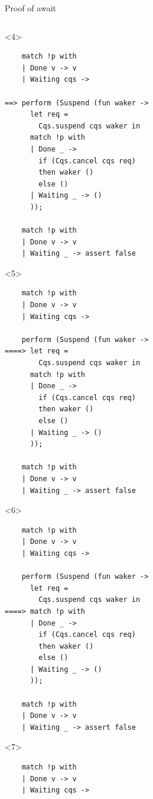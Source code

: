 \documentclass[aspectratio=43]{beamer}
\begin{document}
\begin{frame}[fragile,t]{Proof of await}
\begin{columns}
\begin{column}[T]{0.49\textwidth}
            \begin{onlyenv}<4>
                \begin{verbatim}
    match !p with
    | Done v -> v
    | Waiting cqs ->
    
==> perform (Suspend (fun waker ->
      let req = 
        Cqs.suspend cqs waker in
      match !p with
      | Done _ -> 
        if (Cqs.cancel cqs req)
        then waker ()
        else ()
      | Waiting _ -> ()
      ));
    
    match !p with
    | Done v -> v
    | Waiting _ -> assert false
        \end{verbatim}
            \end{onlyenv}

            \begin{onlyenv}<5>
                \begin{verbatim}
    match !p with
    | Done v -> v
    | Waiting cqs ->
    
    perform (Suspend (fun waker ->
====> let req = 
        Cqs.suspend cqs waker in
      match !p with
      | Done _ -> 
        if (Cqs.cancel cqs req)
        then waker ()
        else ()
      | Waiting _ -> ()
      ));
    
    match !p with
    | Done v -> v
    | Waiting _ -> assert false
        \end{verbatim}
            \end{onlyenv}

            \begin{onlyenv}<6>
                \begin{verbatim}
    match !p with
    | Done v -> v
    | Waiting cqs ->
    
    perform (Suspend (fun waker ->
      let req = 
        Cqs.suspend cqs waker in
====> match !p with
      | Done _ -> 
        if (Cqs.cancel cqs req)
        then waker ()
        else ()
      | Waiting _ -> ()
      ));
    
    match !p with
    | Done v -> v
    | Waiting _ -> assert false
        \end{verbatim}
            \end{onlyenv}

            \begin{onlyenv}<7>
                \begin{verbatim}
    match !p with
    | Done v -> v
    | Waiting cqs ->
    

\end{verbatim}
\end{onlyenv}
\end{column}
\end{columns}
\end{frame}
\end{document}
